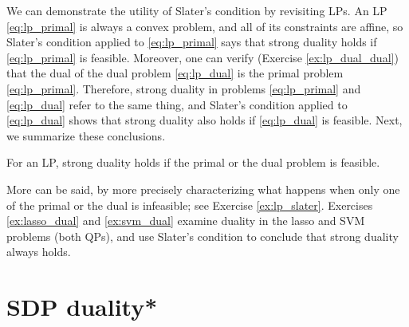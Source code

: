 We can demonstrate the utility of Slater's condition by revisiting LPs. An LP
\eqref{eq:lp_primal} is always a convex problem, and all of its constraints are
affine, so Slater's condition applied to \eqref{eq:lp_primal} says that strong
duality holds if \eqref{eq:lp_primal} is feasible. Moreover, one can verify
(Exercise \ref{ex:lp_dual_dual}) that the dual of the dual problem
\eqref{eq:lp_dual} is the primal problem \eqref{eq:lp_primal}. Therefore, strong
duality in problems \eqref{eq:lp_primal} and \eqref{eq:lp_dual} refer to the
same thing, and Slater's condition applied to \eqref{eq:lp_dual} shows that
strong duality also holds if \eqref{eq:lp_dual} is feasible. Next, we summarize
these conclusions.  

\begin{Corollary}
\label{cor:slater_lp}
For an LP, strong duality holds if the primal or the dual problem is 
feasible. 
\end{Corollary}

More can be said, by more precisely characterizing what happens when only one of
the primal or the dual is infeasible; see Exercise \ref{ex:lp_slater}. Exercises
\ref{ex:lasso_dual} and \ref{ex:svm_dual} examine duality in the lasso and SVM
problems (both QPs), and use Slater's condition to conclude that strong duality
always holds.        

\section{SDP duality*}
\label{sec:sdp_duality}

